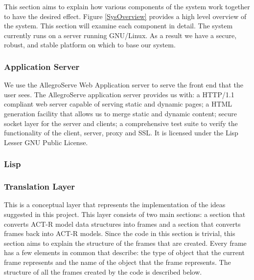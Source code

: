 This section aims to explain how various components of the system work
together to have the desired effect. Figure \ref{SysOverview} provides
a high level overview of the system.  This section will examine each
component in detail.  The system currently runs on a server running
GNU\slash Linux.  As a result we have a secure, robust, and stable
platform on which to base our system.


\subsubsection{Application Server}

We use the AllegroServe Web Application server to serve the front end
that the user sees. The AllegroServe\cite{aserve2009} application server provides us
with: a HTTP/1.1 compliant web server capable of serving static and
dynamic pages; a HTML generation facility that allows us to merge
static and dynamic content; secure socket layer for the server and
clients; a comprehensive test suite to verify the functionality of the
client, server, proxy and SSL. It is licensed under the Lisp Lesser
GNU Public License. 

\subsubsection{Lisp}




\subsubsection{Translation Layer}

This is a conceptual layer that represents the implementation of the
ideas suggested in this project. This layer consists of two main
sections: a section that converts ACT-R model data structures into
frames and a section that converts frames back into ACT-R
models. Since the code in this section is trivial, this section aims
to explain the structure of the frames that are created. Every frame
has a few elements in common that describe: the type of object that the
current frame represents and the name of the object that the frame
represents. The structure of all the frames created by the code is
described below.

